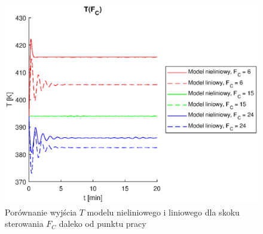 \begin{figure}
	\centering
	\includegraphics[width=.8\linewidth]{plot/lin_tfc_1.eps}
	\caption{Porównanie wyjścia $T$ modelu nieliniowego i liniowego dla skoku sterowania $F_C$ daleko od punktu pracy}
	\label{fig:lintfc1}
\end{figure}